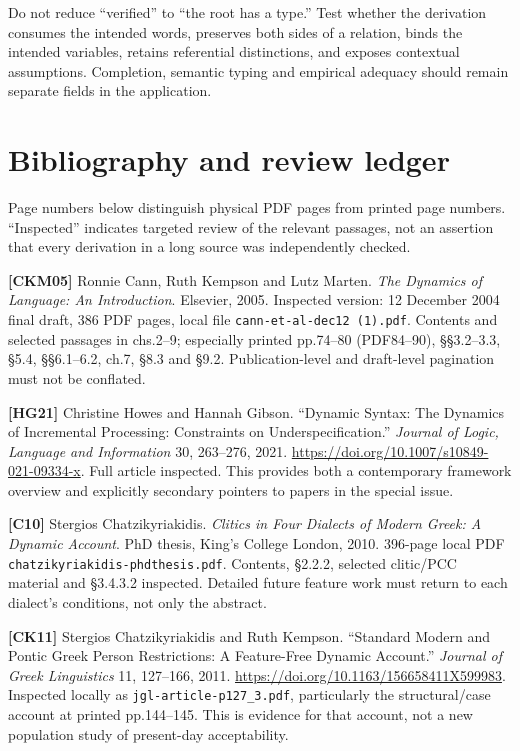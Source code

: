 \documentclass[11pt,a4paper]{article}
\begin{document}
Do not reduce ``verified'' to ``the root has a type.'' Test whether the
derivation consumes the intended words, preserves both sides of a
relation, binds the intended variables, retains referential
distinctions, and exposes contextual assumptions. Completion, semantic
typing and empirical adequacy should remain separate fields in the
application.

\section{Bibliography and review
ledger}\label{bibliography-and-review-ledger}

Page numbers below distinguish physical PDF pages from printed page
numbers. ``Inspected'' indicates targeted review of the relevant
passages, not an assertion that every derivation in a long source was
independently checked.

\textbf{{[}CKM05{]}} Ronnie Cann, Ruth Kempson and Lutz Marten.
\emph{The Dynamics of Language: An Introduction}. Elsevier, 2005.
Inspected version: 12 December 2004 final draft, 386 PDF pages, local
file \texttt{cann-et-al-dec12\ (1).pdf}. Contents and selected passages
in chs.2--9; especially printed pp.74--80 (PDF84--90), §§3.2--3.3, §5.4,
§§6.1--6.2, ch.7, §8.3 and §9.2. Publication-level and draft-level
pagination must not be conflated.

\textbf{{[}HG21{]}} Christine Howes and Hannah Gibson. ``Dynamic Syntax:
The Dynamics of Incremental Processing: Constraints on
Underspecification.'' \emph{Journal of Logic, Language and Information}
30, 263--276, 2021. \url{https://doi.org/10.1007/s10849-021-09334-x}.
Full article inspected. This provides both a contemporary framework
overview and explicitly secondary pointers to papers in the special
issue.

\textbf{{[}C10{]}} Stergios Chatzikyriakidis. \emph{Clitics in Four
Dialects of Modern Greek: A Dynamic Account}. PhD thesis, King's College
London, 2010. 396-page local PDF
\nolinkurl{chatzikyriakidis-phdthesis.pdf}. Contents, §2.2.2, selected
clitic/PCC material and §3.4.3.2 inspected. Detailed future feature work
must return to each dialect's conditions, not only the abstract.

\textbf{{[}CK11{]}} Stergios Chatzikyriakidis and Ruth Kempson.
``Standard Modern and Pontic Greek Person Restrictions: A Feature-Free
Dynamic Account.'' \emph{Journal of Greek Linguistics} 11, 127--166,
2011. \url{https://doi.org/10.1163/156658411X599983}. Inspected locally
as \nolinkurl{jgl-article-p127_3.pdf}, particularly the structural/case
account at printed pp.144--145. This is evidence for that account, not a
new population study of present-day acceptability.
\end{document}
